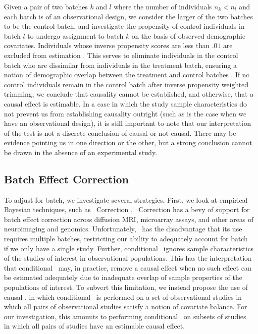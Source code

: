 Given a pair of two batches $k$ and $l$ where the number of individuals $n_k < n_l$ and each batch is of an observational design, we consider the larger of the two batches to be the control batch, and investigate the propensity of control individuals in batch $l$ to undergo assignment to batch $k$ on the basis of observed demographic covariates. Individuals whose inverse propensity scores are less than $.01$ are excluded from estimation \cite{Rosenbaum1983Apr,Stuart2010Feb,Powell2020Sep}. This serves to eliminate individuals in the control batch who are dissimilar from individuals in the treatment batch, ensuring a notion of demographic overlap between the treatment and control batches \cite{Rosenbaum1983Apr,Stuart2010Feb}. If no control individuals remain in the control batch after inverse propensity weighted trimming, we conclude that causality cannot be established, and otherwise, that a causal effect is estimable. In a case in which the study sample characteristics do not prevent us from establishing causality outright (such as is the case when we have an observational design), it is still important to note that our interpretation of the test is not a discrete conclusion of causal or not causal. There may be evidence pointing us in one direction or the other, but a strong conclusion cannot be drawn in the absence of an experimental study.

\subsection{Batch Effect Correction} 
\label{sec:batch_cor}
To adjust for batch, we investigate several strategies. First, we look at empirical Bayesian techniques, such as \Combat\ Correction \cite{Johnson2007Jan}. \Combat\ Correction has a bevy of support for batch effect correction across diffusion MRI, microarray assays, and other areas of neuroimaging and genomics. Unfortunately, \Combat\ has the disadvantage that its use requires multiple batches, restricting our ability to adequately account for batch if we only have a single study. Further, conditional \Combat~ignores sample characteristics of the studies of interest in observational populations. This has the interpretation that conditional \Combat\ may, in practice, remove a causal effect when no such effect can be estimated adequately due to inadequate overlap of sample properties of the populations of interest. To subvert this limitation, we instead propose the use of causal \Combat, in which conditional \Combat\ is performed on a set of observational studies in which all pairs of observational studies satisfy a notion of covariate balance. For our investigation, this amounts to performing conditional \Combat\ on subsets of studies in which all pairs of studies have an estimable causal effect.

